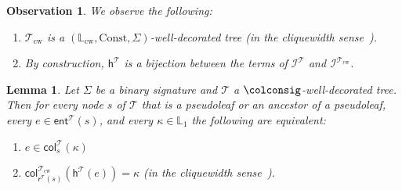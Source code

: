 \documentclass[10pt,a4paper]{amsart}
\theoremstyle{definition}
\numberwithin{equation}{section}
\theoremstyle{plain}
\newtheorem{lemma}[lemma]{Lemma}
\newtheorem{observation}[observation]{Observation}
\theoremstyle{definition}
\theoremstyle{myexample}
\theoremstyle{plain}
\theoremstyle{definition}
\newcommand{\instance}{\mathcal{I}}
\newcommand{\inst}{\instance}
\newcommand{\cols}{\mathbb{L}}
\newcommand{\fcn}[1]{\mathsf{#1}}
\newcommand{\ent}{\fcn{ent}}
\newcommand{\col}{\fcn{col}}
\begin{document}
\begin{observation}\label{obs:hcwtocw-bin}
	We observe the following:
	\begin{enumerate}
		\item \label{item:obshcwtocw-bin-1} $\mathcal{T}_{\mathrm{cw}}$ is a $(\cols_{\mathrm{cw}}, \mathrm{Const}, \Sigma)$-well-decorated tree (in the cliquewidth sense~\cite[Definition 6]{ICDT2023}).
		\item \label{item:obshcwtocw-bin-2} By construction, $\fcn{h}^{\mathcal{T}}$ is a bijection between the terms of $ \inst^{\mathcal{T}}$ and $\inst^{\mathcal{T}_{\mathrm{cw}}}$.
	\end{enumerate}
\end{observation}
\begin{lemma}\label{lem:hcwtocw-bin-cols}
	Let $\Sigma$ be a binary signature and $\mathcal{T}$ a $\colconsig$-well-decorated tree. Then for every node $s$ of $\mathcal{T}$ that is a pseudoleaf or an ancestor of a pseudoleaf, every $e\in\ent^{\mathcal{T}}\!(s)$, and every $\kappa\in\cols_1$ the following are equivalent:
	\begin{enumerate}
		\item $e\in\col_s^{\mathcal{T}}(\kappa)$
		\item $\col_{\fcn{r}^{\mathcal{T}}\!(s)}^{\mathcal{T}_{\mathrm{cw}}}(\fcn{h}^{\mathcal{T}}\!(e)) = \kappa$ (in the cliquewidth sense~\cite[Definition 7]{ICDT2023}).
	\end{enumerate}
\end{lemma}
\end{document}
